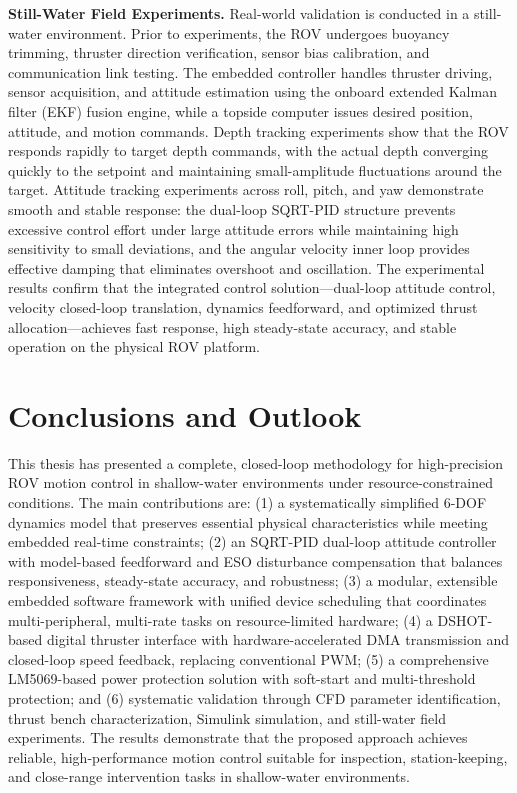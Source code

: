 \begin{digest}
\textbf{Still-Water Field Experiments.} Real-world validation is conducted in a still-water environment. Prior to experiments, the ROV undergoes buoyancy trimming, thruster direction verification, sensor bias calibration, and communication link testing. The embedded controller handles thruster driving, sensor acquisition, and attitude estimation using the onboard extended Kalman filter (EKF) fusion engine, while a topside computer issues desired position, attitude, and motion commands. Depth tracking experiments show that the ROV responds rapidly to target depth commands, with the actual depth converging quickly to the setpoint and maintaining small-amplitude fluctuations around the target. Attitude tracking experiments across roll, pitch, and yaw demonstrate smooth and stable response: the dual-loop SQRT-PID structure prevents excessive control effort under large attitude errors while maintaining high sensitivity to small deviations, and the angular velocity inner loop provides effective damping that eliminates overshoot and oscillation. The experimental results confirm that the integrated control solution---dual-loop attitude control, velocity closed-loop translation, dynamics feedforward, and optimized thrust allocation---achieves fast response, high steady-state accuracy, and stable operation on the physical ROV platform.

\section{Conclusions and Outlook}

This thesis has presented a complete, closed-loop methodology for high-precision ROV motion control in shallow-water environments under resource-constrained conditions. The main contributions are: (1) a systematically simplified 6-DOF dynamics model that preserves essential physical characteristics while meeting embedded real-time constraints; (2) an SQRT-PID dual-loop attitude controller with model-based feedforward and ESO disturbance compensation that balances responsiveness, steady-state accuracy, and robustness; (3) a modular, extensible embedded software framework with unified device scheduling that coordinates multi-peripheral, multi-rate tasks on resource-limited hardware; (4) a DSHOT-based digital thruster interface with hardware-accelerated DMA transmission and closed-loop speed feedback, replacing conventional PWM; (5) a comprehensive LM5069-based power protection solution with soft-start and multi-threshold protection; and (6) systematic validation through CFD parameter identification, thrust bench characterization, Simulink simulation, and still-water field experiments. The results demonstrate that the proposed approach achieves reliable, high-performance motion control suitable for inspection, station-keeping, and close-range intervention tasks in shallow-water environments.


\end{digest}
